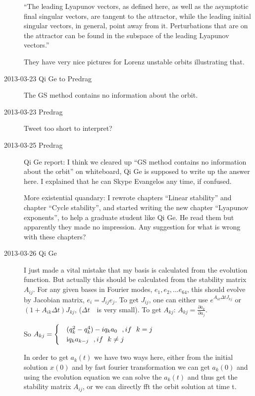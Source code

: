 \begin{description}
``The leading Lyapunov vectors, as defined here, as well as the
asymptotic final singular vectors, are tangent to the attractor,
while the leading initial singular vectors, in general, point away
from it. Perturbations that are on the attractor can be found in the
subspace of the leading Lyapunov vectors.''

They have very nice pictures for Lorenz unstable orbits illustrating that.

\item[2013-03-23 Qi Ge to Predrag]
The
GS method contains no information about the orbit.
\item[2013-03-23 Predrag]
Tweet too short to interpret?

\item[2013-03-25 Predrag] Qi Ge report: I think we cleared up ``GS method
contains no information about the orbit'' on whiteboard, Qi Ge is
supposed to write up the answer here. I explained that he can Skype
Evangelos any time, if confused.

More existential quandary: I rewrote chapters
 {``Linear stability''}
and chapter  {``Cycle
stability''}, and started writing the new chapter
 {``Lyapunov
exponents''}, to help a graduate student like Qi Ge. He read them but
apparently they made no impression. Any suggestion for what is wrong with
these chapters?

\item[2013-03-26 Qi Ge]
I just made a vital mistake that my basis is calculated from the evolution function. But actually this should be calculated from the stability matrix \(A_{ij}\).
For any given bases in Fourier modes, \(e_1, e_2,... e_{64}\), this should evolve by Jacobian matrix, \(e_i = J_{ij}e_j\).
To get \(J_{ij}\), one can either use \(e^{A_{ik}\Delta{t}J_{kj}}\) or\((1+A_{ik}\Delta{t})J_{kj}\), (\(\Delta{t}\)~~is very small).
To get \(A_{kj}\): \(A_{kj}=\frac{\partial{\dot{a_k}}}{\partial{a_j}}\).

So \(A_{kj}=
\begin{cases}
 & \text(q_{k}^2-q_{k}^4)-iq_ka_0~~,{if}~~ k=j \\
 & \text iq_ka_{k-j}~~,{ if }~~ k\neq j
\end{cases}\)

In order to get \(a_k(t)\) we have two ways here, either from the initial solution \(x(0)\) and by fast fourier transformation we can get \(a_k(0)\) and using the evolution equation we can solve the \(a_k(t)\) and thus get the stability matrix \(A_{ij}\), or we can directly fft the orbit solution at time t.


\end{description}
